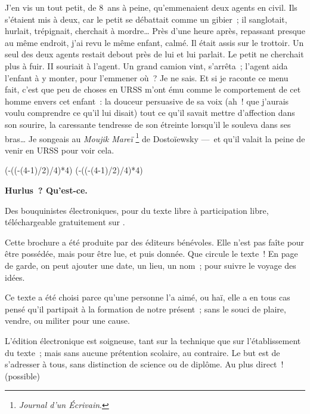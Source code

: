 \documentclass[french,twoside]{book} %
\def\truncdiv#1#2{((#1-(#2-1)/2)/#2)}
\def\moduloop#1#2{(#1-\truncdiv{#1}{#2}*#2)}
\def\modulo#1#2{\number\numexpr\moduloop{#1}{#2}\relax}
\begin{document}
J’en vis un tout petit, de 8 ans à peine, qu’emmenaient deux agents en civil. Ils s’étaient mis à deux, car le petit se débattait comme un gibier ; il sanglotait, hurlait, trépignait, cherchait à mordre… Près d’une heure après, repassant presque au même endroit, j’ai revu le même enfant, calmé. Il était assis sur le trottoir. Un seul des deux agents restait debout près de lui et lui parlait. Le petit ne cherchait plus à fuir. II souriait à l’agent. Un grand camion vint, s’arrêta ; l’agent aida l’enfant à y monter, pour l’emmener où ? Je ne sais. Et si je raconte ce menu fait, c’est que peu de choses en URSS m’ont ému comme le comportement de cet homme envers cet enfant : la douceur persuasive de sa voix (ah ! que j’aurais voulu comprendre ce qu’il lui disait) tout ce qu’il savait mettre d’affection dans son sourire, la caressante tendresse de son étreinte lorsqu’il le souleva dans ses bras… Je songeais au \emph{Moujik Mareï} \footnote{\emph{Journal d’un Écrivain}.} de Dostoïewsky — et qu’il valait la peine de venir en URSS pour voir cela.
 


\ifbooklet
  \pagestyle{empty}
  \clearpage
  \ifnum\modulo{\value{page}}{4}=0 \hbox{}\newpage\hbox{}\newpage\fi
  \ifnum\modulo{\value{page}}{4}=1 \hbox{}\newpage\hbox{}\newpage\fi


  \hbox{}\newpage
  \ifodd\value{page}\hbox{}\newpage\fi
  {\centering\color{rubric}\bfseries\noindent\large
    Hurlus ? Qu’est-ce.\par
    \bigskip
  }
  \noindent Des bouquinistes électroniques, pour du texte libre à participation libre,
  téléchargeable gratuitement sur \href{https://hurlus.fr}{}.\par
  \bigskip
  \noindent Cette brochure a été produite par des éditeurs bénévoles.
  Elle n’est pas faîte pour être possédée, mais pour être lue, et puis donnée.
  Que circule le texte !
  En page de garde, on peut ajouter une date, un lieu, un nom ; pour suivre le voyage des idées.
  \par

  Ce texte a été choisi parce qu’une personne l’a aimé,
  ou haï, elle a en tous cas pensé qu’il partipait à la formation de notre présent ;
  sans le souci de plaire, vendre, ou militer pour une cause.
  \par

  L’édition électronique est soigneuse, tant sur la technique
  que sur l’établissement du texte ; mais sans aucune prétention scolaire, au contraire.
  Le but est de s’adresser à tous, sans distinction de science ou de diplôme.
  Au plus direct ! (possible)
  \par
\end{document}
